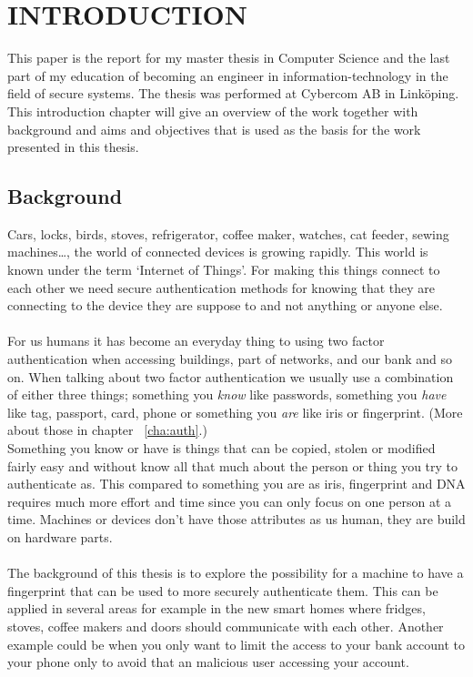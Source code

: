 \chapter{INTRODUCTION}\label{cha:intro}
This paper is the report for my master thesis in Computer Science and the last part of my education of becoming an engineer in information-technology in the field of secure systems. The thesis was performed at Cybercom AB in Linköping. \\
This introduction chapter will give an overview of the work together with background and aims and objectives that is used as the basis for the work presented in this thesis. 

\section{Background}\label{sec:bg}
Cars, locks, birds, stoves, refrigerator, coffee maker, watches, cat feeder, sewing machines\dots, the world of connected devices is growing rapidly. This world is known under the term `Internet of Things'. For making this things connect to each other we need secure authentication methods for knowing that they are connecting to the device they are suppose to and not anything or anyone else. \\
\\
For us humans it has become an everyday thing to using two factor authentication when accessing buildings, part of networks, and our bank and so on. When talking about two factor authentication we usually use a combination of either three things; something you \textit{know} like passwords, something you \textit{have} like tag, passport, card, phone or something you \textit{are} like iris or fingerprint. (More about those in chapter ~\ref{cha:auth}.)  \\
Something you know or have is things that can be copied, stolen or modified fairly easy and without know all that much about the person or thing you try to authenticate as. This compared to something you are as iris, fingerprint and DNA requires much more effort and time since you can only focus on one person at a time. Machines or devices don't have those attributes as us human, they are build on hardware parts.\\ 
\\
The background of this thesis is to explore the possibility for a machine to have a fingerprint that can be used to more securely authenticate them. This can be applied in several areas for example in the new smart homes where fridges, stoves, coffee makers and doors should communicate with each other. Another example could be when you only want to limit the access to your bank account to your phone only to avoid that an malicious user accessing your account.

